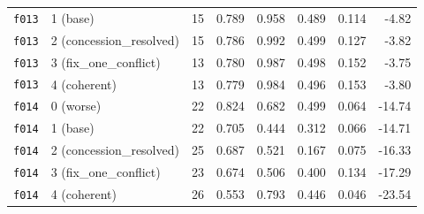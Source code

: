 \documentclass[11pt]{article}
\begin{document}
\begin{table}[htbp]
\begin{tabular}{llrrrrrr}
\texttt{f013} & 1 (base) & 15 & 0.789 & 0.958 & 0.489 & 0.114 & -4.82 \\
\texttt{f013} & 2 (concession\_resolved) & 15 & 0.786 & 0.992 & 0.499 & 0.127 & -3.82 \\
\texttt{f013} & 3 (fix\_one\_conflict) & 13 & 0.780 & 0.987 & 0.498 & 0.152 & -3.75 \\
\texttt{f013} & 4 (coherent) & 13 & 0.779 & 0.984 & 0.496 & 0.153 & -3.80 \\
\midrule
\texttt{f014} & 0 (worse) & 22 & 0.824 & 0.682 & 0.499 & 0.064 & -14.74 \\
\texttt{f014} & 1 (base) & 22 & 0.705 & 0.444 & 0.312 & 0.066 & -14.71 \\
\texttt{f014} & 2 (concession\_resolved) & 25 & 0.687 & 0.521 & 0.167 & 0.075 & -16.33 \\
\texttt{f014} & 3 (fix\_one\_conflict) & 23 & 0.674 & 0.506 & 0.400 & 0.134 & -17.29 \\
\texttt{f014} & 4 (coherent) & 26 & 0.553 & 0.793 & 0.446 & 0.046 & -23.54 \\
\bottomrule
\end{tabular}
\end{table}
\end{document}
